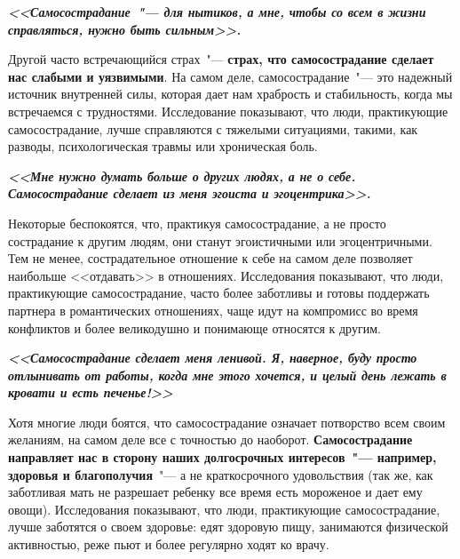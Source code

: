 \vspace{4ex}

\textbf{\textit{<<Самосострадание~"--- для нытиков, а мне, чтобы со всем в жизни справляться, нужно быть сильным>>.}}

\vspace{2ex}

Другой часто встречающийся страх~"--- \textbf{страх, что самосострадание сделает нас слабыми и уязвимыми}. На самом деле, самосострадание~"--- это надежный источник внутренней силы, которая дает нам храбрость и стабильность, когда мы встречаемся с трудностями. Исследование показывают, что люди, практикующие самосострадание, лучше справляются с тяжелыми ситуациями, такими, как разводы, психологическая травмы или хроническая боль.

\vspace{4ex}

\textbf{\textit{<<Мне нужно думать больше о других людях, а не о себе. Самосострадание сделает из меня эгоиста и эгоцентрика>>.}}

\vspace{2ex}

Некоторые беспокоятся, что, практикуя самосострадание, а не просто сострадание к другим людям, они станут эгоистичными или эгоцентричными. Тем не менее, сострадательное отношение к себе на самом деле позволяет наибольше <<отдавать>> в отношениях. Исследования показывают, что люди, практикующие самосострадание, часто более заботливы и готовы поддержать партнера в романтических отношениях, чаще идут на компромисс во время конфликтов и более великодушно и понимающе относятся к другим. 

\vspace{4ex}

\textbf{\textit{<<Самосострадание сделает меня ленивой. Я, наверное, буду просто отлынивать от работы, когда мне этого хочется, и целый день лежать в кровати и есть печенье!>>}}

\vspace{2ex}

Хотя многие люди боятся, что самосострадание означает потворство всем своим желаниям, на самом деле все с точностью до наоборот. \textbf{Самосострадание направляет нас в сторону наших долгосрочных интересов~"--- например, здоровья и благополучия}~"--- а не краткосрочного удовольствия (так же, как заботливая мать не разрешает ребенку все время есть мороженое и дает ему овощи).  Исследования показывают, что люди, практикующие самосострадание, лучше заботятся о своем здоровье: едят здоровую пищу, занимаются физической активностью, реже пьют и более регулярно ходят ко врачу. 

